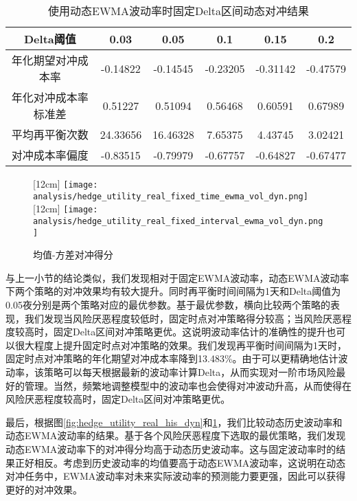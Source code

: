 \begin{table}[htbp]
  \centering
  \caption{使用动态EWMA波动率时固定Delta区间动态对冲结果}
  \label{tab:fixed_interval_5_ewma_vol_dyn}
  \begin{tabular}{cccccc}
    \toprule
    Delta阈值 & 0.03 & 0.05 & 0.1 & 0.15 & 0.2 \\
    \midrule
    年化期望对冲成本率 & -0.14822 & -0.14545 & -0.23205 & -0.31142 & -0.47579 \\
    年化对冲成本率标准差 & 0.51227 & 0.51094 & 0.56468 & 0.60591 & 0.67989 \\
    平均再平衡次数 & 24.33656 & 16.46328 & 7.65375 & 4.43745 & 3.02421 \\
    对冲成本率偏度 & -0.83515 & -0.79979 & -0.67757 & -0.64827 & -0.67477 \\
    \bottomrule
  \end{tabular}
\end{table}

\begin{figure}[htb]
  \centering
  [12cm]
    {\texttt{[image: analysis/hedge\_utility\_real\_fixed\_time\_ewma\_vol\_dyn.png]}}
  \hspace{0.5cm}
  [12cm]
    {\texttt{[image: analysis/hedge\_utility\_real\_fixed\_interval\_ewma\_vol\_dyn.png]}}
    \caption[这里将出现在插图索引中]
    {均值-方差对冲得分}
  \label{fig:hedge_utility_real_ewma_dyn}
\end{figure}

与上一小节的结论类似，我们发现相对于固定EWMA波动率，动态EWMA波动率下两个策略的对冲效果均有较大提升。同时再平衡时间间隔为1天和Delta阈值为0.05夜分别是两个策略对应的最优参数。基于最优参数，横向比较两个策略的表现，我们发现当风险厌恶程度较低时，固定时点对冲策略得分较高；当风险厌恶程度较高时，固定Delta区间对冲策略更优。这说明波动率估计的准确性的提升也可以很大程度上提升固定时点对冲策略的效果。我们发现再平衡时间间隔为1天时，固定时点对冲策略的年化期望对冲成本率降到13.483\%。由于可以更精确地估计波动率，该策略可以每天根据最新的波动率计算Delta，从而实现对一阶市场风险最好的管理。当然，频繁地调整模型中的波动率也会使得对冲波动升高，从而使得在风险厌恶程度较高时，固定Delta区间对冲策略更优。

最后，根据图\ref{fig:hedge_utility_real_his_dyn}和\ref{fig:hedge_utility_real_ewma_dyn}，我们比较动态历史波动率和动态EWMA波动率的结果。基于各个风险厌恶程度下选取的最优策略，我们发现动态EWMA波动率下的对冲得分均高于动态历史波动率。这与固定波动率时的结果正好相反。考虑到历史波动率的均值要高于动态EWMA波动率，这说明在动态对冲任务中，EWMA波动率对未来实际波动率的预测能力要更强，因此可以获得更好的对冲效果。


